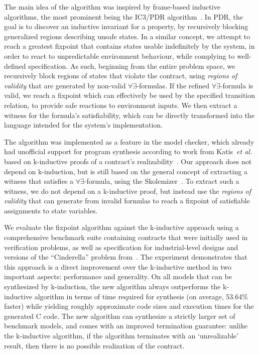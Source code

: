 The main idea of the algorithm was inspired by frame-based inductive algorithms, the most prominent being the IC3/PDR algorithm~\cite{bradley2011sat,een2011efficient}. In PDR, the goal is to discover an inductive invariant for a property, by recursively blocking generalized regions describing unsafe states. In a similar concept, we attempt
to reach a greatest fixpoint that contains states usable indefinitely by the
system, in order to react to unpredictable environment behaviour, while
complying to well-defined specification. As such, beginning from the entire
problem space, we recursively block regions of states that violate the contract, using \textit{regions of validity} that are
generated by non-valid $\forall\exists$-formulas. If the refined
$\forall\exists$-formula is valid, we reach a fixpoint which can effectively be used by the specified transition relation, to
provide safe reactions to environment inputs. We then extract a witness for the
formula's satisfiability, which can be directly transformed into the
language intended for the system's implementation.

The algorithm was implemented as a feature in the \jkind model checker, which
already had unofficial support for program synthesis according to work from
Katis~\textit{et al.} based on k-inductive proofs of a contract's
realizability~\cite{gacek2015towards,katis2016towards,katis2016synthesis}.
Our approach does not depend on k-induction, but is still based on the general
concept of extracting a witness that satisfies a $\forall\exists$-formula, using
the \aeval Skolemizer~\cite{fedyukovich2015automated}. To extract such a witness, we do not depend on a k-inductive proof, but instead use the \textit{regions of validity} that \aeval can generate from invalid formulas to reach a fixpoint of satisfiable assignments to state variables.

We evaluate the fixpoint algorithm against the k-inductive approach using a comprehensive benchmark suite containing contracts that were initially used in verification problems, as well as specification for industrial-level designs and versions of the ``Cinderella'' problem from~\cite{beyene2014constraint}.  The experiment demonstrates that this approach is a direct improvement over the k-inductive method in two important aspects: performance and generality.  On all models that can be synthesized by k-induction, the new algorithm always outperforms the k-inductive algorithm in terms of time required for synthesis (on average, 53.64\% faster) while yielding roughly approximate code sizes and execution times for the generated C code.  The new algorithm can synthesize a strictly larger set of benchmark models, and comes with an improved termination guarantee: unlike the k-inductive algorithm, if the algorithm terminates with an `unrealizable' result, then there is no possible realization of the contract.

